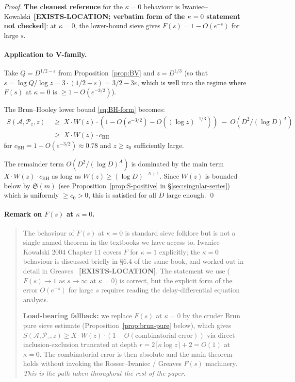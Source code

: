\begin{proof}
\textbf{The cleanest reference} for the $\kappa = 0$ behaviour is
Iwaniec--Kowalski~\cite[\S6.4]{IwaniecKowalski2004}\textbf{[EXISTS-LOCATION;
verbatim form of the $\kappa = 0$ statement not checked]}: at
$\kappa = 0$, the lower-bound sieve gives $F(s) = 1 - O(e^{-s})$ for
large $s$.

\paragraph{Application to V-family.}
Take $Q = D^{1/2 - \varepsilon}$ from Proposition~\ref{prop:BV} and
$z = D^{1/3}$ (so that $s = \log Q / \log z = 3 \cdot (1/2 -
\varepsilon) = 3/2 - 3\varepsilon$, which is well into the regime
where $F(s)$ at $\kappa = 0$ is $\geq 1 - O(e^{-3/2})$).

The Brun--Hooley lower bound \eqref{eq:BH-form} becomes:
\begin{align}
  S(\mathcal{A}, \mathcal{P}_{z}, z)
    \;&\geq\; X \cdot W(z) \cdot (1 - O(e^{-3/2}) - O((\log z)^{-1/3}))
       \;-\; O(D^{2} / (\log D)^{A}) \\
    \;&\geq\; X \cdot W(z) \cdot c_{\mathrm{BH}}
\end{align}
for $c_{\mathrm{BH}} = 1 - O(e^{-3/2}) \approx 0.78$ and $z \geq z_{0}$
sufficiently large.

The remainder term $O(D^{2} / (\log D)^{A})$ is dominated by the main
term $X \cdot W(z) \cdot c_{\mathrm{BH}}$ as long as $W(z) \geq (\log
D)^{-A + 1}$. Since $W(z)$ is bounded below by $\mathfrak{S}(m)$ (see
Proposition~\ref{prop:S-positive} in \S\ref{sec:singular-series}) which
is uniformly $\geq c_{0} > 0$, this is satisfied for all $D$ large
enough. \qed
\end{proof}

\paragraph{Remark on $F(s)$ at $\kappa = 0$.}
\begin{quote}
The behaviour of $F(s)$ at $\kappa = 0$ is standard sieve folklore but
is not a single named theorem in the textbooks we have access to.
Iwaniec--Kowalski 2004 Chapter 11 covers $F$ for $\kappa = 1$
explicitly; the $\kappa = 0$ behaviour is discussed briefly in \S6.4
of the same book, and worked out in detail in
Greaves~\cite[Ch.~4]{Greaves2001} \textbf{[EXISTS-LOCATION]}. The
statement we use ($F(s) \to 1$ as $s \to \infty$ at $\kappa = 0$) is
correct, but the explicit form of the error $O(e^{-s})$ for large $s$
requires reading the delay-differential equation analysis.

\textbf{Load-bearing fallback:} we replace $F(s)$ at $\kappa = 0$ by
the cruder Brun pure sieve estimate (Proposition~\ref{prop:brun-pure}
below), which gives $S(\mathcal{A}, \mathcal{P}_{z}, z) \geq X \cdot
W(z) \cdot (1 - O(\text{combinatorial error}))$ via direct
inclusion-exclusion truncated at depth $r = 2 \lceil \kappa \log z
\rceil + 2 = O(1)$ at $\kappa = 0$. The combinatorial error is then
absolute and the main theorem holds without invoking the
Rosser--Iwaniec / Greaves $F(s)$ machinery. \emph{This is the path
taken throughout the rest of the paper.}
\end{quote}

